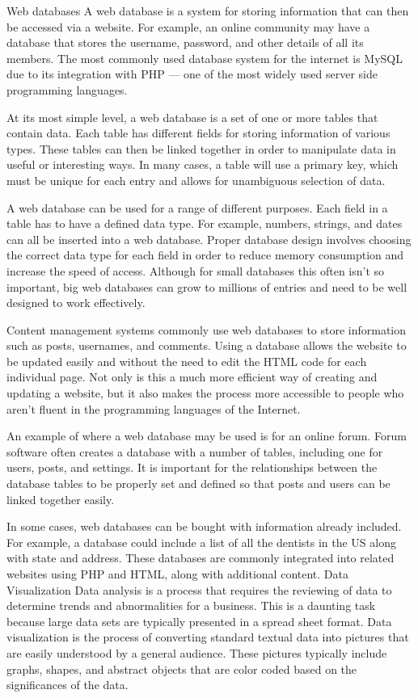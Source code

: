 


Web databases
A web database is a system for storing information that can then be accessed via a website. For example, an online community may have a database that stores the username, password, and other details of all its members. The most commonly used database system for the internet is MySQL due to its integration with PHP — one of the most widely used server side programming languages.

At its most simple level, a web database is a set of one or more tables that contain data. Each table has different fields for storing information of various types. These tables can then be linked together in order to manipulate data in useful or interesting ways. In many cases, a table will use a primary key, which must be unique for each entry and allows for unambiguous selection of data.

A web database can be used for a range of different purposes. Each field in a table has to have a defined data type. For example, numbers, strings, and dates can all be inserted into a web database. Proper database design involves choosing the correct data type for each field in order to reduce memory consumption and increase the speed of access. Although for small databases this often isn't so important, big web databases can grow to millions of entries and need to be well designed to work effectively.

Content management systems commonly use web databases to store information such as posts, usernames, and comments. Using a database allows the website to be updated easily and without the need to edit the HTML code for each individual page. Not only is this a much more efficient way of creating and updating a website, but it also makes the process more accessible to people who aren't fluent in the programming languages of the Internet.

An example of where a web database may be used is for an online forum. Forum software often creates a database with a number of tables, including one for users, posts, and settings. It is important for the relationships between the database tables to be properly set and defined so that posts and users can be linked together easily.

In some cases, web databases can be bought with information already included. For example, a database could include a list of all the dentists in the US along with state and address. These databases are commonly integrated into related websites using PHP and HTML, along with additional content.
Data Visualization
Data analysis is a process that requires the reviewing of data to determine trends and abnormalities for a business. This is a daunting task because large data sets are typically presented in a spread sheet format. Data visualization is the process of converting standard textual data into pictures that are easily understood by a general audience. These pictures typically include graphs, shapes, and abstract objects that are color coded based on the significances of the data.

